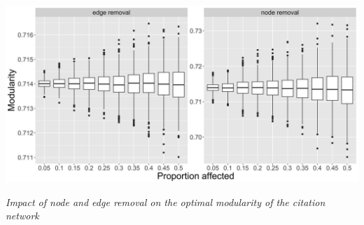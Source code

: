 {\begin{center}
\includegraphics[width=\textwidth]{figures/scim_Fig9.jpg}
\end{center}

\medskip

\textit{Impact of node and edge removal on the optimal modularity of the citation network}


}


